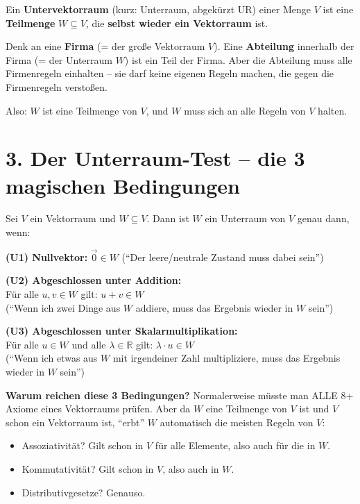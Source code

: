 \documentclass[a4paper,12pt]{article}
\begin{document}
Ein \textbf{Untervektorraum} (kurz: Unterraum, abgek\"urzt UR) einer Menge $V$ ist eine \textbf{Teilmenge} $W \subseteq V$, die \textbf{selbst wieder ein Vektorraum} ist.

\begin{analogie}
Denk an eine \textbf{Firma} (= der gro\ss e Vektorraum $V$). Eine \textbf{Abteilung} innerhalb der Firma (= der Unterraum $W$) ist ein Teil der Firma. Aber die Abteilung muss alle Firmenregeln einhalten -- sie darf keine eigenen Regeln machen, die gegen die Firmenregeln versto\ss en.

Also: $W$ ist eine Teilmenge von $V$, und $W$ muss sich an alle Regeln von $V$ halten.
\end{analogie}

\section*{3. Der Unterraum-Test -- die 3 magischen Bedingungen}

\begin{merkbox}[title={Der Unterraum-Test (URT)}]
Sei $V$ ein Vektorraum und $W \subseteq V$. Dann ist $W$ ein Unterraum von $V$ genau dann, wenn:

\medskip
\textbf{(U1) Nullvektor:} $\vec{0} \in W$ \quad (``Der leere/neutrale Zustand muss dabei sein'')

\medskip
\textbf{(U2) Abgeschlossen unter Addition:}\\
F\"ur alle $u, v \in W$ gilt: $u + v \in W$\\
(``Wenn ich zwei Dinge aus $W$ addiere, muss das Ergebnis wieder in $W$ sein'')

\medskip
\textbf{(U3) Abgeschlossen unter Skalarmultiplikation:}\\
F\"ur alle $u \in W$ und alle $\lambda \in \mathbb{R}$ gilt: $\lambda \cdot u \in W$\\
(``Wenn ich etwas aus $W$ mit irgendeiner Zahl multipliziere, muss das Ergebnis wieder in $W$ sein'')
\end{merkbox}

\textbf{Warum reichen diese 3 Bedingungen?} Normalerweise m\"usste man ALLE 8+ Axiome eines Vektorraums pr\"ufen. Aber da $W$ eine Teilmenge von $V$ ist und $V$ schon ein Vektorraum ist, ``erbt'' $W$ automatisch die meisten Regeln von $V$:
\begin{itemize}
    \item Assoziativit\"at? Gilt schon in $V$ f\"ur alle Elemente, also auch f\"ur die in $W$.
    \item Kommutativit\"at? Gilt schon in $V$, also auch in $W$.
    \item Distributivgesetze? Genauso.
\end{itemize}
\end{document}
